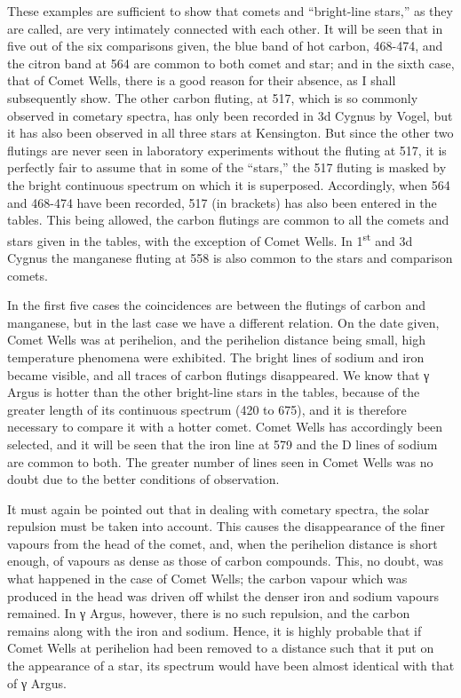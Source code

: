 \documentclass[a4paper, 12pt, oneside, polutonikogreek, english]{article}
\begin{document}
These examples are sufficient to show that comets and ``bright-line stars,'' as they are called, are very intimately connected with each other. It will be seen that in five out of the six comparisons given, the blue band of hot carbon, 468-474, and the citron band at 564 are common to both comet and star; and in the sixth case, that of Comet Wells, there is a good reason for their absence, as I shall subsequently show. The other carbon fluting, at 517, which is so commonly observed in cometary spectra, has only been recorded in 3d Cygnus by Vogel, but it has also been observed in all three stars at Kensington. But since the other two flutings are never seen in laboratory experiments without the fluting at 517, it is perfectly fair to assume that in some of the ``stars,'' the 517 fluting is masked by the bright continuous spectrum on which it is superposed. Accordingly, when 564 and 468-474 have been recorded, 517 (in brackets) has also been entered in the tables. This being allowed, the carbon flutings are common to all the comets and stars given in the tables, with the exception of Comet Wells. In 1\textsuperscript{st} and 3d Cygnus the manganese fluting at 558 is also common to the stars and comparison comets.

In the first five cases the coincidences are between the flutings of carbon and manganese, but in the last case we have a different relation. On the date given, Comet Wells was at perihelion, and the perihelion distance being small, high temperature phenomena were exhibited. The bright lines of sodium and iron became visible, and all traces of carbon flutings disappeared. We know that γ Argus is hotter than the other bright-line stars in the tables, because of the greater length of its continuous spectrum (420 to 675), and it is therefore necessary to compare it with a hotter comet. Comet Wells has accordingly been selected, and it will be seen that the iron line at 579 and the D lines of sodium are common to both. The greater number of lines seen in Comet Wells was no doubt due to the better conditions of observation.

It must again be pointed out that in dealing with cometary spectra, the solar repulsion must be taken into account. This causes the disappearance of the finer vapours from the head of the comet, and, when the perihelion distance is short enough, of vapours as dense as those of carbon compounds. This, no doubt, was what happened in the case of Comet Wells; the carbon vapour which was produced in the head was driven off whilst the denser iron and sodium vapours remained. In γ Argus, however, there is no such repulsion, and the carbon remains along with the iron and sodium. Hence, it is highly probable that if Comet Wells at perihelion had been removed to a distance such that it put on the appearance of a star, its spectrum would have been almost identical with that of γ Argus.
\end{document}
